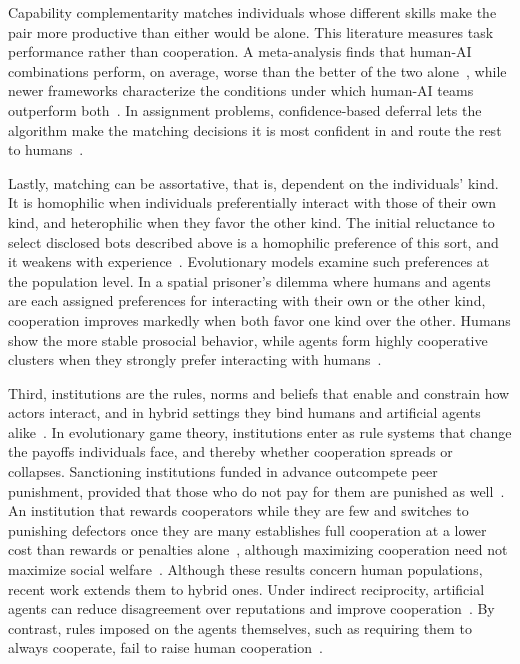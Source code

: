 Capability complementarity matches individuals whose different skills make the pair more productive than either would be alone. This literature measures task performance rather than cooperation. A meta-analysis finds that human-AI combinations perform, on average, worse than the better of the two alone~\cite{vaccaroWhenCombinationsHumans2024}, while newer frameworks characterize the conditions under which human-AI teams outperform both~\cite{gonzalezScienceHumanAI2026}. In assignment problems, confidence-based deferral lets the algorithm make the matching decisions it is most confident in and route the rest to humans~\cite{arnaiz-rodriguezHumanAIComplementarityMatching2025}. 

Lastly, matching can be assortative, that is, dependent on the individuals' kind. It is homophilic when individuals preferentially interact with those of their own kind, and heterophilic when they favor the other kind. The initial reluctance to select disclosed bots described above is a homophilic preference of this sort, and it weakens with experience~\cite{jiangHumansLearnPrefer2025}. Evolutionary models examine such preferences at the population level. In a spatial prisoner's dilemma where humans and agents are each assigned preferences for interacting with their own or the other kind, cooperation improves markedly when both favor one kind over the other. Humans show the more stable prosocial behavior, while agents form highly cooperative clusters when they strongly prefer interacting with humans~\cite{jiaAsymmetricInteractionPreference2025}.


Third, institutions are the rules, norms and beliefs that enable and constrain how actors interact, and in hybrid settings they bind humans and artificial agents alike~\cite{bartelheimerConceptualizingHybridIntelligent2025}. In evolutionary game theory, institutions enter as rule systems that change the payoffs individuals face, and thereby whether cooperation spreads or collapses. Sanctioning institutions funded in advance outcompete peer punishment, provided that those who do not pay for them are punished as well~\cite{sigmundSocialLearningPromotes2010}. An institution that rewards cooperators while they are few and switches to punishing defectors once they are many establishes full cooperation at a lower cost than rewards or penalties alone~\cite{chenFirstCarrotThen2015}, although maximizing cooperation need not maximize social welfare~\cite{hanEvolutionaryMechanismsThat2024}. Although these results concern human populations, recent work extends them to hybrid ones. Under indirect reciprocity, artificial agents can reduce disagreement over reputations and improve cooperation~\cite{Pires2025}. By contrast, rules imposed on the agents themselves, such as requiring them to always cooperate, fail to raise human cooperation~\cite{hintzePromotingCooperationPublic2026}.


